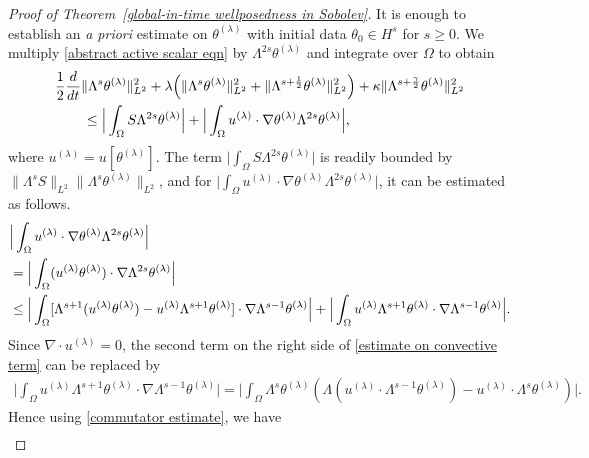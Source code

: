 \documentclass[reqno]{amsart}%
\theoremstyle{definition}
\theoremstyle{remark}
\numberwithin{equation}{section}
\newcommand{\dis}{\displaystyle}
\newcommand{\thetalambda}{\theta^{(\lambda)}}
\newcommand{\1}{\mathbf{1}}
\numberwithin{equation}{section}
\numberwithin{theorem}{section}
\numberwithin{figure}{section}
\begin{document}
\begin{proof}[Proof of Theorem~\ref{global-in-time wellposedness in Sobolev}]
It is enough to establish an {\it a priori} estimate on $\theta^{(\lambda)}$ with initial data $\theta_0\in H^s$ for $s\ge0$. We multiply \eqref{abstract active scalar eqn} by $\Lambda^{2s}\thetalambda$ and integrate over $\Omega$ to obtain
\begin{align}\label{differential inequality on theta}
&\frac{1}{2}\frac{d}{dt}\|\Lambda^s\theta^{(\lambda)}\|^2_{L^2}+\lambda\Big(\|\Lambda^{s}\theta^{(\lambda)}\|^2_{L^2}+\|\Lambda^{s+\frac{1}{2}}\theta^{(\lambda)}\|^2_{L^2}\Big)+\kappa\|\Lambda^{s+\frac{\gamma}{2}}\theta^{(\lambda)}\|^2_{L^2}\notag\\
&\qquad\le\Big|\int_{\Omega}S\Lambda^{2s}\theta^{(\lambda)}\Big|+\Big|\int_{\Omega}u^{(\lambda)}\cdot\nabla\theta^{(\lambda)}\Lambda^{2s}\theta^{(\lambda)}\Big|,
\end{align}
where $u^{(\lambda)}=u[\thetalambda]$. The term $\dis\Big|\int_{\Omega}S\Lambda^{2s}\theta^{(\lambda)}\Big|$ is readily bounded by $\dis\|\Lambda^sS\|_{L^2}\|\Lambda^s\theta^{(\lambda)}\|_{L^2}$, and for $\dis\Big|\int_{\Omega}u^{(\lambda)}\cdot\nabla\theta^{(\lambda)}\Lambda^{2s}\theta^{(\lambda)}\Big|$, it can be estimated as follows.
\begin{align}\label{estimate on convective term}
&\Big|\int_{\Omega}u^{(\lambda)}\cdot\nabla\theta^{(\lambda)}\Lambda^{2s}\theta^{(\lambda)}\Big|\notag\\
&=\Big|\int_{\Omega}(u^{(\lambda)}\theta^{(\lambda)})\cdot\nabla\Lambda^{2s}\theta^{(\lambda)}\Big|\notag\\
&\le\Big|\int_{\Omega}[\Lambda^{s+1}(u^{(\lambda)}\theta^{(\lambda)})-u^{(\lambda)}\Lambda^{s+1}\theta^{(\lambda)}]\cdot\nabla\Lambda^{s-1}\theta^{(\lambda)}\Big|+\Big|\int_{\Omega}u^{(\lambda)}\Lambda^{s+1}\theta^{(\lambda)}\cdot\nabla\Lambda^{s-1}\theta^{(\lambda)}\Big|.
\end{align}
Since $\nabla\cdot u^{(\lambda)}=0$, the second term on the right side of \eqref{estimate on convective term} can be replaced by
\begin{align*}
\Big|\int_{\Omega}u^{(\lambda)}\Lambda^{s+1}\theta^{(\lambda)}\cdot\nabla\Lambda^{s-1}\theta^{(\lambda)}\Big|=\Big|\int_{\Omega}\Lambda^{s}\theta^{(\lambda)}(\Lambda(u^{(\lambda)}\cdot\Lambda^{s-1}\theta^{(\lambda)})-u^{(\lambda)}\cdot\Lambda^{s}\theta^{(\lambda)})\Big|.
\end{align*}
Hence using \eqref{commutator estimate}, we have
\begin{align*}

\end{align*}
\end{proof}
\end{document}
